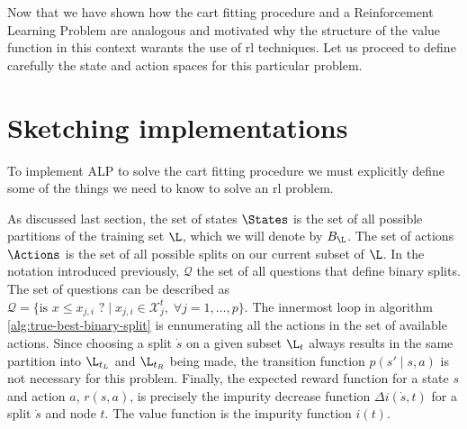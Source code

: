 
Now that we have shown how the \ac{cart} fitting procedure and a Reinforcement
Learning Problem are analogous and motivated why the structure of the value
function in this context warants the use of \ac{rl} techniques. Let us proceed
to define carefully the state and action spaces for this particular problem.

\section{Sketching implementations}

To implement ALP to solve the \ac{cart} fitting procedure we must explicitly
define some of the things we need to know to solve an \ac{rl} problem.

As discussed last section, the set of states $\States$ is the set of all
possible partitions of the training set $\L$, which we will denote by $B_{\L}$.
The set of actions $\Actions$ is the set of all possible splits on our current
subset of $\L$. In the notation introduced previously, $\mathcal{Q}$ the set of
all questions that define binary splits. The set of questions can be described
as $\mathcal{Q} = \{ \text{is } x \leq x_{j, i} \text{ ?} \mid x_{j, i} \in
\mathcal{X}_{j}^{t}, \; \forall j = 1, \dots, p \}$.  The innermost loop in
algorithm \ref{alg:true-best-binary-split} is ennumerating all the actions in
the set of available actions. Since choosing a split $\dot{s}$ on a given subset
$\L_t$ always results in the same partition into $\L_{t_L}$ and $\L_{t_R}$ being
made, the transition function $p(s' \mid s, a)$ is not necessary for this
problem. Finally, the expected reward function for a state $s$ and action $a$,
$r(s, a)$, is precisely the impurity decrease function $\Delta i(\dot{s}, t)$
for a split $\dot{s}$ and node $t$. The value function is the impurity function
$i(t)$.

